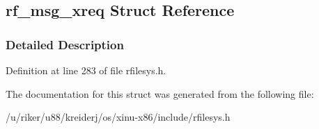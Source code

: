 \hypertarget{structrf__msg__xreq}{}\subsection{rf\+\_\+msg\+\_\+xreq Struct Reference}
\label{structrf__msg__xreq}


\subsubsection{Detailed Description}


Definition at line 283 of file rfilesys.\+h.



The documentation for this struct was generated from the following file\+:\begin{DoxyCompactItemize}
\item 
/u/riker/u88/kreiderj/os/xinu-\/x86/include/rfilesys.\+h\end{DoxyCompactItemize}
